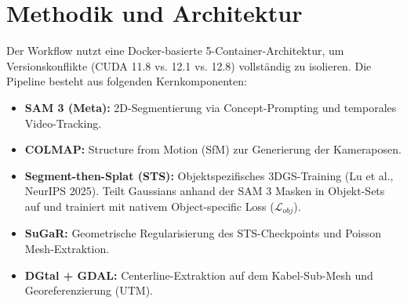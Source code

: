 \documentclass[12pt,a4paper]{article}
\begin{document}
\section{Methodik und Architektur}
Der Workflow nutzt eine Docker-basierte 5-Container-Architektur, um Versionskonflikte (CUDA 11.8 vs. 12.1 vs. 12.8) vollständig zu isolieren. Die Pipeline besteht aus folgenden Kernkomponenten:
\begin{itemize}[noitemsep]
    \item \textbf{SAM 3 (Meta):} 2D-Segmentierung via Concept-Prompting und temporales Video-Tracking.
    \item \textbf{COLMAP:} Structure from Motion (SfM) zur Generierung der Kameraposen.
    \item \textbf{Segment-then-Splat (STS):} Objektspezifisches 3DGS-Training (Lu et al., NeurIPS 2025). Teilt Gaussians anhand der SAM 3 Masken in Objekt-Sets auf und trainiert mit nativem Object-specific Loss ($\mathcal{L}_{obj}$).
    \item \textbf{SuGaR:} Geometrische Regularisierung des STS-Checkpoints und Poisson Mesh-Extraktion.
    \item \textbf{DGtal + GDAL:} Centerline-Extraktion auf dem Kabel-Sub-Mesh und Georeferenzierung (UTM).
\end{itemize}
\end{document}
